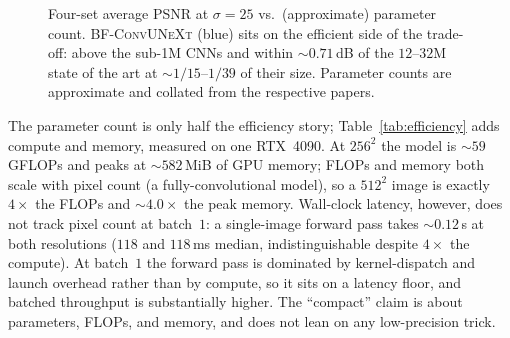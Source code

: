 \documentclass{article}
\newcommand{\model}{\textsc{BF-ConvUNeXt}}
\begin{document}
\begin{figure}[H]
\centering
{}
\caption{Four-set average PSNR at $\sigma{=}25$ vs.\ (approximate) parameter count. \model{} (blue) sits on the efficient side of the trade-off: above the sub-1M CNNs and within $\sim0.71$\,dB of the $12$--$32$M state of the art at $\sim1/15$--$1/39$ of their size. Parameter counts are approximate and collated from the respective papers.}
\label{fig:params}
\end{figure}

The parameter count is only half the efficiency story; Table~\ref{tab:efficiency} adds compute and memory, measured on one RTX~4090. At $256^2$ the model is $\sim59$\,GFLOPs and peaks at $\sim582$\,MiB of GPU memory; FLOPs and memory both scale with pixel count (a fully-convolutional model), so a $512^2$ image is exactly $4\times$ the FLOPs and $\sim4.0\times$ the peak memory. Wall-clock latency, however, does not track pixel count at batch~$1$: a single-image forward pass takes $\sim0.12$\,s at both resolutions ($118$ and $118$\,ms median, indistinguishable despite $4\times$ the compute). At batch~$1$ the forward pass is dominated by kernel-dispatch and launch overhead rather than by compute, so it sits on a latency floor, and batched throughput is substantially higher. The ``compact'' claim is about parameters, FLOPs, and memory, and does not lean on any low-precision trick.
\end{document}
